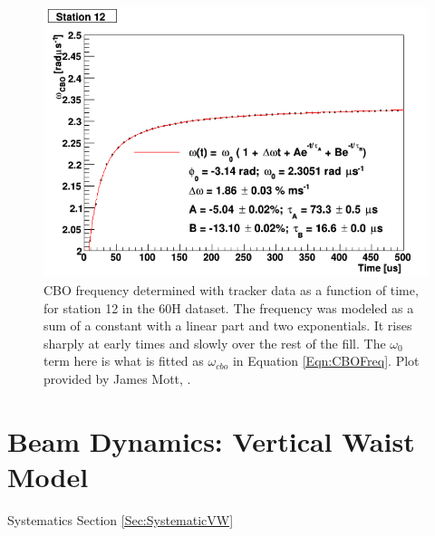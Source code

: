 	\begin{figure}[]
		\centering
		\includegraphics[width=\textwidth]{TrackerCBOModel}
	    \caption[TrackerCBOModel]{CBO frequency determined with tracker data as a function of time, for station 12 in the 60H dataset. The frequency was modeled as a sum of a constant with a linear part and two exponentials. It rises sharply at early times and slowly over the rest of the fill. The $\omega_{0}$ term here is what is fitted as $\omega_{cbo}$ in Equation \ref{Eqn:CBOFreq}. Plot provided by James Mott, .}
	    \label{fig:TrackerCBOModel}
	\end{figure}

\clearpage

\section{Beam Dynamics: Vertical Waist Model}
\label{Sec:VW}

	\noindent Systematics Section \ref{Sec:SystematicVW} \\

